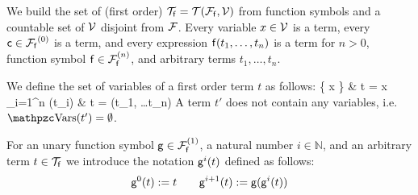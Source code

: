 
\begin{definition}\label{def:terms}
	We build the set of (first order) $\mcTf = \mcTFfV$
	from function symbols and a
	countable set of $\mcV$ disjoint from $\mcF$\!.
	Every variable $x\in\mcV$ is a term,
	every  $\mc\in\mcFf^{(0)}$ is a term,
	and every expression $\mf(t_1,\ldots,t_n)$ is a term
	for $n>0$, function symbol $\mf\in\mcFfn$,
	and arbitrary terms $t_1,\ldots,t_n$.
\end{definition}

\begin{definition}\label{def:term:vars}\label{def:term:ground}
	We define the set of variables of a first order term $t$ as follows:
	 {
		\{ x \} &  t = x \in \mcV \\
		\bigcup_{i=1}^n \var(t_i) &   t = \mf(t_1, \ldots t_n)
	}
	A  term $t'$ does not contain any variables, i.e.~$\var(t') = \emptyset$.
\end{definition}

\begin{definition}\label{def:unary:power}
	For an unary function symbol $\mg\in\mcFfn[1]$, a natural number
	$i\in\mathbb{N}$, and an arbitrary term $t\in\mcTf$ we introduce the notation $\mg^i(t)$ defined as follows:
	\[
	\mg^0(t) := t \qquad
	\mg^{i+1}(t) := \mg(\mg^i(t))
	\]
\end{definition}

